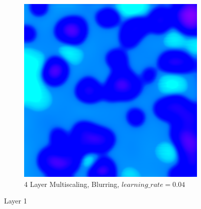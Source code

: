 \begin{figure}
\begin{subfigure}[t]{0.31\textwidth}
    \end{subfigure}
    \hfill
    \begin{subfigure}[t]{0.31\textwidth}
        \captionsetup{justification=centering}
        \centering
        \includegraphics[width=.7\linewidth]{figuras/feat_vis/experiments/layers/initial/l1/random_image_pl4_lr4e-2_layer0.png}
        \caption{4 Layer Multiscaling, Blurring, \(learning\_rate = 0.04\)}
    \end{subfigure}

    \caption{Layer 1}
    \label{fig:layer_1}
\end{figure}

